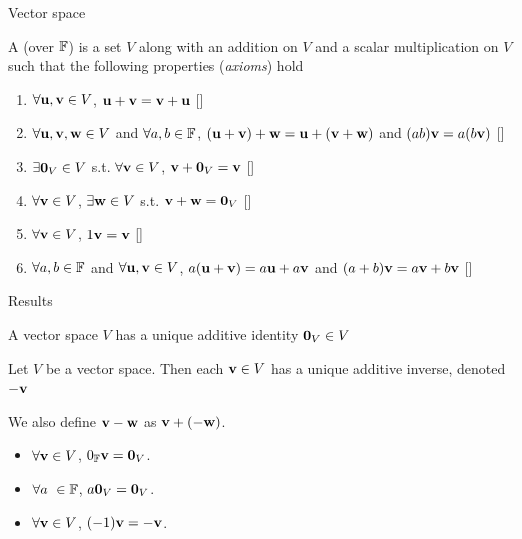 \documentclass[aspectratio=169]{beamer}
\begin{document}
\begin{frame}{Vector space}
\begin{definition}
A  (over $\mathbb{F}$) is a set $V$ along with an addition on $V$ and a scalar multiplication on $V$ such that the following properties (\emph{axioms}) hold
\begin{enumerate}
\item $\forall \mathbf{u},\mathbf{v}\in V$, $\mathbf{u}+\mathbf{v}=\mathbf{v}+\mathbf{u}$  \hfill[]
\item $\forall \mathbf{u},\mathbf{v},\mathbf{w}\in V$ and $\forall a,b\in\mathbb{F}$, $(\mathbf{u}+\mathbf{v})+\mathbf{w}=\mathbf{u}+(\mathbf{v}+\mathbf{w})$ and $(ab)\mathbf{v}=a(b\mathbf{v})$ 
\newline\mbox{}\hfill[]
\item $\exists \b0_V\in V$ s.t. $\forall \mathbf{v}\in V$, $\bv+\b0_V=\bv$
\hfill[]
\item $\forall \mathbf{v}\in V$, $\exists \mathbf{w}\in V$ s.t. $\bv+\bw=\b0_V$
\hfill[]
\item $\forall \mathbf{v}\in V$, $1\mathbf{v}=\mathbf{v}$
\hfill[]
\item $\forall a,b\in\mathbb{F}$ and $\forall \mathbf{u},\mathbf{v}\in V$, 
$a(\mathbf{u}+\mathbf{v})=a\mathbf{u}+a\mathbf{v}$ and $(a+b)\mathbf{v}=a\mathbf{v}+b\mathbf{v}$ \newline\mbox{}
\hfill[]
\end{enumerate}
\end{definition}
\end{frame}

\begin{frame}{Results}
\begin{importanttheorem}
A vector space $V$ has a unique additive identity $\b0_V\in V$
\end{importanttheorem}
\begin{importanttheorem}
Let $V$ be a vector space. Then each $\mathbf{v}\in V$ has a unique additive inverse, denoted $-\mathbf{v}$
\end{importanttheorem}
We also define $\mathbf{v}-\mathbf{w}$ as $\mathbf{v}+(-\mathbf{w})$.
\begin{theorem}
    \begin{itemize}
    \item $\forall \mathbf{v}\in V$, $0_\IF \bv=\b0_V$.
    \item $\forall a\ \in\mathbb{F}$, $a\b0_V=\b0_V$.
    \item $\forall \mathbf{v}\in V$, $(-1)\mathbf{v}=-\mathbf{v}$.
    \end{itemize}
\end{theorem}
\end{frame}
    
\end{document}
